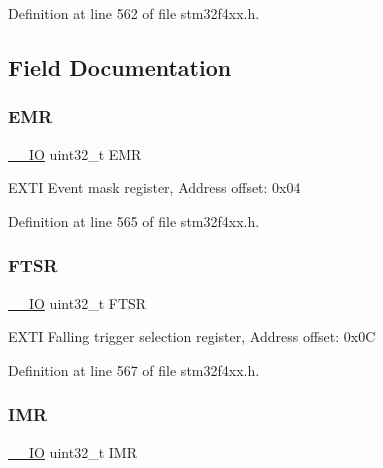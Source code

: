 Definition at line 562 of file stm32f4xx.\+h.



\subsection{Field Documentation}
\mbox{\label{struct_e_x_t_i___type_def_a6034c7458d8e6030f6dacecf0f1a3a89}} 
\subsubsection{\texorpdfstring{E\+MR}{EMR}}
{\footnotesize\ttfamily \hyperlink{group___c_m_s_i_s__core__definitions_gaec43007d9998a0a0e01faede4133d6be}{\+\_\+\+\_\+\+IO} uint32\+\_\+t E\+MR}

E\+X\+TI Event mask register, Address offset\+: 0x04 

Definition at line 565 of file stm32f4xx.\+h.

\mbox{\label{struct_e_x_t_i___type_def_aa0f7c828c46ae6f6bc9f66f11720bbe6}} 
\subsubsection{\texorpdfstring{F\+T\+SR}{FTSR}}
{\footnotesize\ttfamily \hyperlink{group___c_m_s_i_s__core__definitions_gaec43007d9998a0a0e01faede4133d6be}{\+\_\+\+\_\+\+IO} uint32\+\_\+t F\+T\+SR}

E\+X\+TI Falling trigger selection register, Address offset\+: 0x0C 

Definition at line 567 of file stm32f4xx.\+h.

\mbox{\label{struct_e_x_t_i___type_def_ae845b86e973b4bf8a33c447c261633f6}} 
\subsubsection{\texorpdfstring{I\+MR}{IMR}}
{\footnotesize\ttfamily \hyperlink{group___c_m_s_i_s__core__definitions_gaec43007d9998a0a0e01faede4133d6be}{\+\_\+\+\_\+\+IO} uint32\+\_\+t I\+MR}

